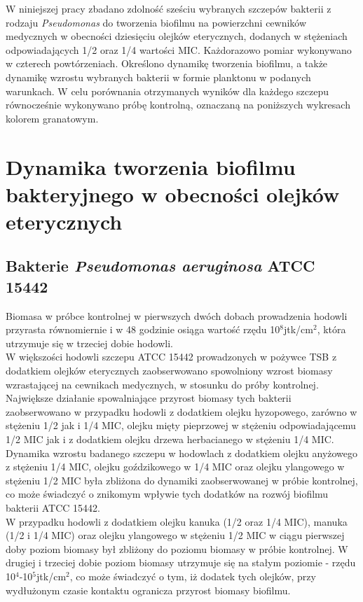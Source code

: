 \documentclass[11pt,a4paper]{report}
\begin{document}
%
%
%
W niniejszej pracy zbadano zdolność sześciu wybranych szczepów bakterii z rodzaju \textit{Pseudomonas} do tworzenia biofilmu na powierzchni cewników medycznych w obecności dziesięciu olejków eterycznych, dodanych w stężeniach odpowiadających 1/2 oraz 1/4 wartości MIC. Każdorazowo pomiar wykonywano w czterech powtórzeniach.
Określono dynamikę tworzenia biofilmu, a także dynamikę wzrostu wybranych bakterii w formie planktonu w podanych warunkach.
W celu porównania otrzymanych wyników dla każdego szczepu równocześnie wykonywano próbę kontrolną, oznaczaną na poniższych wykresach kolorem granatowym.

\clearpage

\section{Dynamika tworzenia biofilmu bakteryjnego w obecności olejków eterycznych}

\subsection{Bakterie \textit{Pseudomonas aeruginosa} ATCC 15442} 

Biomasa w próbce kontrolnej w pierwszych dwóch dobach prowadzenia hodowli przyrasta równomiernie i w 48 godzinie osiąga wartość rzędu 10$^8$jtk/cm$^2$, która utrzymuje się w trzeciej dobie hodowli.\\
W większości hodowli szczepu ATCC 15442 prowadzonych w pożywce TSB z dodatkiem olejków eterycznych zaobserwowano spowolniony wzrost biomasy wzrastającej na cewnikach medycznych, w stosunku do próby kontrolnej.
Największe działanie spowalniające przyrost biomasy tych bakterii zaobserwowano w przypadku hodowli z dodatkiem olejku hyzopowego, zarówno w stężeniu 1/2 jak i 1/4 MIC, olejku mięty pieprzowej w stężeniu odpowiadającemu 1/2 MIC jak i z dodatkiem olejku drzewa herbacianego w stężeniu 1/4 MIC.\\
Dynamika wzrostu badanego szczepu w hodowlach z dodatkiem olejku anyżowego z stężeniu 1/4 MIC, olejku goździkowego w 1/4 MIC oraz olejku ylangowego w stężeniu 1/2 MIC była zbliżona do dynamiki zaobserwowanej w próbie kontrolnej, co może świadczyć o znikomym wpływie tych dodatków na rozwój biofilmu bakterii ATCC 15442.\\
W przypadku hodowli z dodatkiem olejku kanuka (1/2 oraz 1/4 MIC), manuka (1/2 i 1/4 MIC) oraz olejku ylangowego w stężeniu 1/2 MIC w ciągu pierwszej doby poziom biomasy był zbliżony do poziomu biomasy w próbie kontrolnej. W drugiej i trzeciej dobie poziom biomasy utrzymuje się na stałym poziomie - rzędu 10$^4$-10$^5$jtk/cm$^2$, co może świadczyć o tym, iż dodatek tych olejków, przy wydłużonym czasie kontaktu ogranicza przyrost biomasy biofilmu. 
\clearpage
\end{document}
